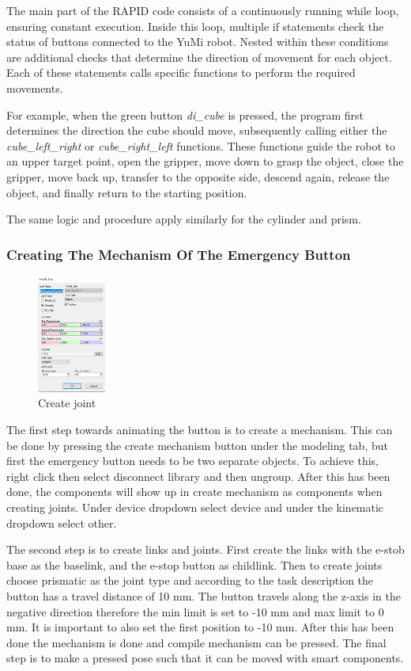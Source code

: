 \documentclass[a4paper,12pt]{article}
\begin{document}
The main part of the RAPID code consists of a continuously running while loop, ensuring constant execution. Inside this loop, multiple if statements check the status of buttons connected to the YuMi robot. Nested within these conditions are additional checks that determine the direction of movement for each object. Each of these statements calls specific functions to perform the required movements.

For example, when the green button \textit{di\_cube} is pressed, the program first determines the direction the cube should move, subsequently calling either the \textit{cube\_left\_right} or \textit{cube\_right\_left} functions. These functions guide the robot to an upper target point, open the gripper, move down to grasp the object, close the gripper, move back up, transfer to the opposite side, descend again, release the object, and finally return to the starting position.

The same logic and procedure apply similarly for the cylinder and prism.

\subsubsection{Creating The Mechanism Of The Emergency Button}
\begin{figure}
  \label{fig:create_joint}
  \centering
  \includegraphics[width=0.2\textwidth]{create_joint.png}
  \caption{Create joint}
\end{figure}
The first step towards animating the button is to create a mechanism. This can be done by pressing the create mechanism button under the modeling tab, but first the emergency button needs to be two separate objects. To achieve this, right click then select disconnect library and then ungroup. After this has been done, the components will show up in create mechanism as components when creating joints. Under device dropdown select device and under the kinematic dropdown select other.

The second step is to create links and joints. First create the links with the e-stob base as the baselink, and the e-stop button as childlink. Then to create joints choose prismatic as the joint type and according to the task description the button has a travel distance of 10 mm. The button travels along the z-axis in the negative direction therefore the min limit is set to -10 mm and max limit to 0 mm. It is important to also set the first position to -10 mm. After this has been done the mechanism is done and compile mechanism can be pressed. The final step is to make a pressed pose such that it can be moved with smart components.
\end{document}
